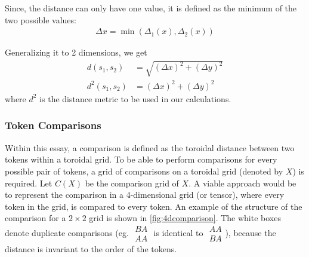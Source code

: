 Since, the distance can only have one value, it is defined as the minimum of the two possible values:
\begin{align*}
    \Delta x=\min{(\Delta_1(x),\Delta_2(x))}
\end{align*}

Generalizing it to 2 dimensions, we get
\begin{align*}
    d(s_1,s_2)&=\sqrt{(\Delta x)^2+(\Delta y)^2} \\
    d^2(s_1,s_2)&=(\Delta x)^2+(\Delta y)^2
\end{align*}
where $d^2$ is the distance metric to be used in our calculations.

\subsubsection{Token Comparisons}%
\label{ssub:token_comparisons}
Within this essay, a comparison is defined as the toroidal distance between two tokens within a toroidal grid. To be able to perform comparisons for every possible pair of tokens, a grid of comparisons on a toroidal grid (denoted by $X$) is required. Let $C(X)$ be the comparison grid of $X$. A viable approach would be to represent the comparison in a 4-dimensional grid (or tensor), where every token in the grid, is compared to every token. An example of the structure of the comparison for a $2\times 2$ grid is shown in \autoref{fig:4dcomparison}. The white boxes denote duplicate comparisons (eg. $
\begin{smallmatrix}
    BA\\ AA
\end{smallmatrix}
$ is identical to
$
\begin{smallmatrix}
    AA\\ BA
\end{smallmatrix}
$), because the distance is invariant to the order of the tokens.

